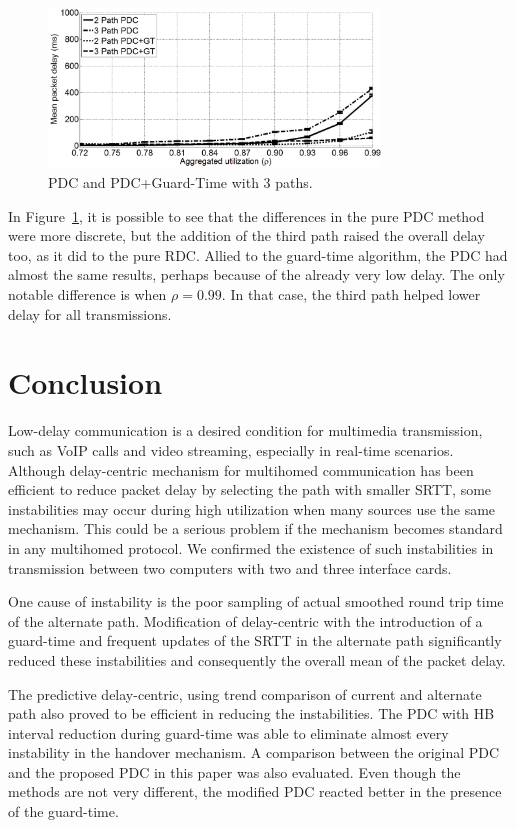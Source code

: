 \documentclass[letterpaper,10pt,oneside,conference,final]{sbrt2015}
\begin{document}
\begin{figure}[h!]
	\centering
	\includegraphics[width=8.8cm,height=4.3cm]{figura9}
	\caption{PDC and PDC+Guard-Time with 3 paths.}
	\label{figura9}
\end{figure}

In Figure~\ref{figura9}, it is possible to see that the differences in the pure PDC method were more discrete, but the addition of the third path raised the overall delay too, as it did to the pure RDC. Allied to the guard-time algorithm, the PDC had almost the same results, perhaps because of the already very low delay. The only notable difference is when $\rho = 0.99$. In that case, the third path helped lower delay for all transmissions.


\section{Conclusion}

Low-delay communication is a desired condition for multimedia transmission, such as VoIP calls and video streaming, especially in real-time scenarios. Although delay-centric mechanism for multihomed communication has been efficient to reduce packet delay by selecting the path with smaller SRTT, some instabilities may occur during high utilization when many sources use the same mechanism. This could be a serious problem if the mechanism becomes standard in any multihomed protocol. We confirmed the existence of such instabilities in transmission between two computers with two and three interface cards.

One cause of instability is the poor sampling of actual smoothed round trip time of the alternate path. Modification of delay-centric with the introduction of a guard-time and frequent updates of the SRTT in the alternate path significantly reduced these instabilities and consequently the overall mean of the packet delay.

The predictive delay-centric, using trend comparison of current and alternate path also proved to be efficient in reducing the instabilities. The PDC with HB interval reduction during guard-time was able to eliminate almost every instability in the handover mechanism. A comparison between the original PDC \cite{Torres2014} and the proposed PDC in this paper was also evaluated. Even though the methods are not very different, the modified PDC reacted better in the presence of the guard-time.
\end{document}
